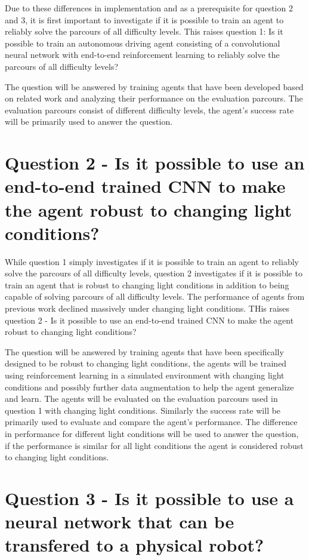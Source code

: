 Due to these differences in implementation and as a prerequisite for question 2 and 3, it is first important to investigate if it is possible to train an agent to reliably solve the parcours of all difficulty levels. This raises question 1:
Is it possible to train an autonomous driving agent consisting of a convolutional neural network with end-to-end reinforcement learning to reliably solve the parcours of all difficulty levels?

The question will be answered by training agents that have been developed based on related work and analyzing their performance on the evaluation parcours. The evaluation parcours consist of different difficulty levels, the agent's success rate will be primarily used to answer the question.



\section{Question 2 - Is it possible to use an end-to-end trained CNN to make the agent robust to changing light conditions?}

While question 1 simply investigates if it is possible to train an agent to reliably solve the parcours of all difficulty levels, question 2 investigates if it is possible to train an agent that is robust to changing light conditions in addition to being capable of solving parcours of all difficulty levels. The performance of agents from previous work \autocite{maximilian} declined massively under changing light conditions. THis raises question 2 - Is it possible to use an end-to-end trained CNN to make the agent robust to changing light conditions?

The question will be answered by training agents that have been specifically designed to be robust to changing light conditions, the agents will be trained using reinforcement learning in a simulated environment with changing light conditions and possibly further data augmentation to help the agent generalize and learn. The agents will be evaluated on the evaluation parcours used in question 1 with changing light conditions. Similarly the success rate will be primarily used to evaluate and compare the agent's performance. The difference in performance for different light conditions will be used to answer the question, if the performance is similar for all light conditions the agent is considered robust to changing light conditions.

\section{Question 3 - Is it possible to use a neural network that can be transfered to a physical robot?}

